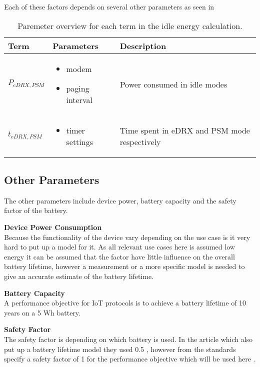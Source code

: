 Each of these factors depends on several other parameters as seen in 

\begin{table}[H]
\centering
\begin{tabular}{|m{3cm}|m{6cm}|} \hline
\textbf{Term} & \textbf{Parameters} & \textbf{Description} \\ \hline
$P_{eDRX,PSM}$ & \begin{itemize}
\item modem
\item paging interval
\end{itemize} & Power consumed in idle modes \\ \hline
$t_{eDRX,PSM}$ & \begin{itemize}
\item timer settings
\end{itemize} & Time spent in eDRX and PSM mode respectively \\ \hline
\end{tabular}
\caption{Paremeter overview for each term in the idle energy calculation.}
\label{tab:Eidle_parameter_overview}
\end{table}



\subsection{Other Parameters}
The other parameters include device power, battery capacity and the safety factor of the battery.

\textbf{Device Power Consumption}\\
Because the functionality of the device vary depending on the use case is it very hard to put up a model for it. As all relevant use cases here is assumed low energy it can be assumed that the factor have little influence on the overall battery lifetime, however a measurement or a more specific model is needed to give an accurate estimate of the battery lifetime.

\textbf{Battery Capacity}\\
A performance objective for IoT protocols is to achieve a battery lifetime of 10 years on a 5 Wh battery. 

\textbf{Safety Factor}\\
The safety factor is depending on which battery is used. In the article which also put up a battery lifetime model they used 0.5 \citep{Power_article}, however from the standards specify a safety factor of 1 for the performance objective which will be used here \citep[Sec. 5.4]{safty_factor_standard}.




